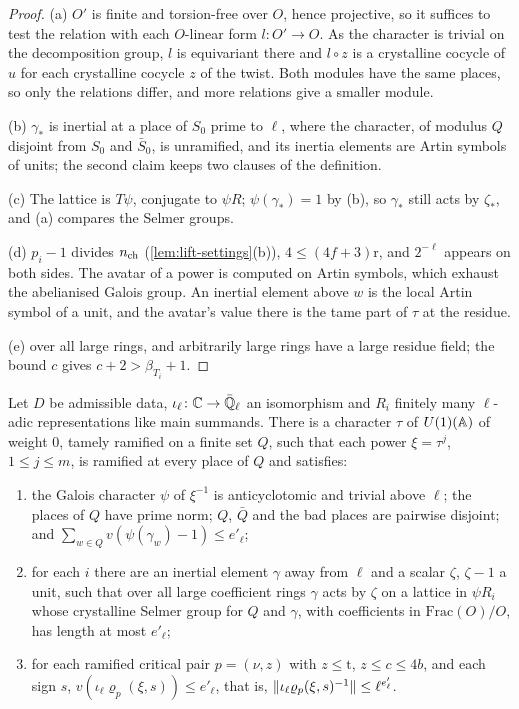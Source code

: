 \begin{proof}
(a) $O'$ is finite and torsion-free over $O$, hence projective, so it suffices to test the relation with each $O$-linear form $l\colon O'\to O$. As the character is trivial on the decomposition group, $l$ is equivariant there and $l\circ z$ is a crystalline cocycle of $u$ for each crystalline cocycle $z$ of the twist. Both modules have the same places, so only the relations
differ, and more relations give a smaller module.

(b) $\gamma_*$ is inertial at a place of $S_0$ prime to $\ell$, where the character, of modulus $Q$ disjoint from $S_0$ and $\bar S_0$, is unramified, and its inertia elements are Artin symbols of units; the second claim keeps two clauses of the definition.

(c) The lattice is $T\psi$, conjugate to $\psi R$; $\psi(\gamma_*)=1$ by (b), so $\gamma_*$ still acts by $\zeta_*$, and (a) compares the Selmer groups.

(d) $p_i-1$ divides $n_{\rm ch}$ (\cref{lem:lift-settings}(b)), $4\le(4f+3)\mathrm r$, and $2^{-\ell}$ appears on both sides. The avatar of a power is computed on Artin symbols, which exhaust the abelianised Galois group. An inertial element above $w$ is the local Artin symbol of a unit, and the avatar's value there is the tame part of $\tau$ at the residue.

(e)  over all large rings, and arbitrarily large rings have a large residue field; the bound $c$ gives $c+2>\beta_{T_i}+1$.
\end{proof}

\begin{theorem}\label{thm:twisting}
Let $D$ be admissible data, $\iota_\ell\colon\mathbb{C}\to\bar{\mathbb{Q}}_\ell$ an isomorphism and $R_i$ finitely many $\ell$-adic representations like main summands. There is a character $\tau$ of $U(1)(\mathbb{A})$ of weight $0$, tamely ramified on a finite set
$Q$, such that each power $\xi=\tau^j$, $1\le j\le m$, is ramified at every place of $Q$ and satisfies:
\begin{enumerate}[label=\textup{(\alph*)}]
\item the Galois character $\psi$ of $\xi^{-1}$ is anticyclotomic and trivial above $\ell$; the places of $Q$ have prime norm; $Q$, $\bar Q$ and the bad places are pairwise disjoint; and $\sum_{w\in Q}v(\psi(\gamma_w)-1)\le e'_\ell$;
\item for each $i$ there are an inertial element $\gamma$ away from $\ell$ and a scalar $\zeta$, $\zeta-1$ a unit, such that over all large coefficient rings $\gamma$ acts by $\zeta$ on a lattice in $\psi R_i$ whose crystalline Selmer group for $Q$ and $\gamma$, with
coefficients in $\mathrm{Frac}(O)/O$, has length at most $e'_\ell$;
\item for each ramified critical pair $p=(\nu,z)$ with $z\le\mathrm t$, $z\le c\le4b$, and each sign $s$, $v(\iota_\ell\varrho_p(\xi,s))\le e'_\ell$, that is, $\lVert \iota_\ell\varrho_p(\xi,s)^{-1}\rVert\le\ell^{e'_\ell}$.
\end{enumerate}
\end{theorem}

